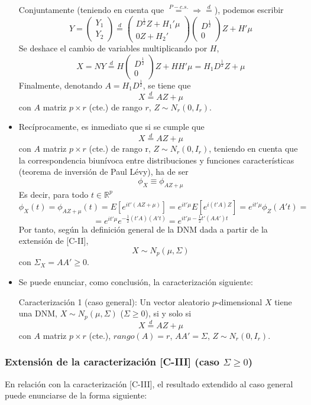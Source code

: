 \documentclass[11pt,a4paper]{article}
\begin{document}
\begin{itemize}
Conjuntamente (teniendo en cuenta que $\overset{P-c.s.}{=} \Rightarrow \overset{d}{=}$), podemos escribir
$$Y = \begin{pmatrix} Y_{1} \\ Y_{2} \end{pmatrix} \overset{d}{=} \begin{pmatrix}
D^{\frac{1}{2}}Z + H_{1}'\mu \\
0Z + H_{2}'
\end{pmatrix} \begin{pmatrix} D^{\frac{1}{2}} \\ 0 \end{pmatrix}Z + H'\mu$$
Se deshace el cambio de variables multiplicando por $H$,
$$X = NY \overset{d}{=} H \begin{pmatrix} D^{\frac{1}{2}} \\ 0 \end{pmatrix}Z + HH'\mu = H_{1}D^{\frac{1}{2}}Z + \mu$$
Finalmente, denotando $A = H_{1}D^{\frac{1}{2}}$, se tiene que
$$X \overset{d}{=} AZ + \mu$$
con $A$ matriz $p \times r$ (cte.) de rango $r$, $Z \sim N_{r}(0, I_{r})$.

\item Recíprocamente, es inmediato que si se cumple que
$$X \overset{d}{=} AZ + \mu$$
con $A$ matriz $p \times r$ (cte.) de rango r, $Z \sim N_{r}(0, I_{r})$, teniendo en cuenta que la correspondencia biunívoca entre distribuciones y funciones características (teorema de inversión de Paul Lévy), ha de ser
$$\phi_{X} \equiv \phi_{AZ + \mu}$$
Es decir, para todo $t \in \mathbb{R}^{p}$
$$\phi_{X}(t) = \phi_{AZ + \mu}(t) = E[e^{it'(AZ + \mu)}] = e^{it'\mu} E[e^{i(t'A)Z}] = e^{it'\mu}\phi_{Z}(A't) =$$
$$= e^{it'\mu}e^{-\frac{1}{2}(t'A)(A't)} = e^{it'\mu - \frac{1}{2}t'(AA')t}$$
Por tanto, según la definición general de la DNM dada a partir de la extensión de [C-II],
$$X \sim N_{p}(\mu, \Sigma)$$
con $\Sigma_{X} = AA' \geq 0$.

\item Se puede enunciar, como conclusión, la caracterización siguiente:

Caracterización 1 (caso general): Un vector aleatorio $p$-dimensional $X$ tiene una DNM, $X \sim N_{p}(\mu, \Sigma)$ ($\Sigma \geq 0$), si y solo si
$$X \overset{d}{=} AZ + \mu$$
con $A$ matriz $p \times r$ (cte.), $rango(A) = r$, $AA' = \Sigma$, $Z \sim N_{r}(0, I_{r})$.
\end{itemize}

\subsubsection{Extensión de la caracterización [C-III] (caso \texorpdfstring{$\Sigma \geq 0$}))}
En relación con la caracterización [C-III], el resultado extendido al caso general puede enunciarse de la forma siguiente:
\end{document}
